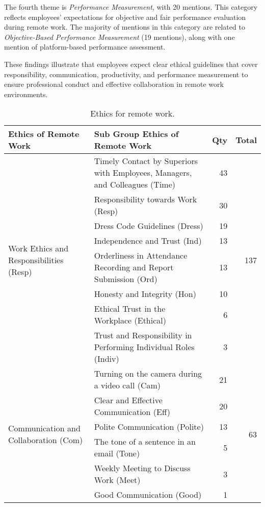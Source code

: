 \documentclass[a4paper, conference]{IEEEtran}
\begin{document}
The fourth theme is \textit{Performance Measurement}, with 20 mentions. This category reflects employees’ expectations for objective and fair performance evaluation during remote work. The majority of mentions in this category are related to \textit{Objective-Based Performance Measurement} (19 mentions), along with one mention of platform-based performance assessment.

These findings illustrate that employees expect clear ethical guidelines that cover responsibility, communication, productivity, and performance measurement to ensure professional conduct and effective collaboration in remote work environments.

\begin{table}
	\centering
	\caption{Ethics for remote work.}
	\label{tab:ethics_for_remote_work}
	\begin{tabular}{|p{}|p{}|r|r|}
		\hline
		\textbf{Ethics of Remote Work} & \textbf{Sub Group Ethics of Remote Work} & \textbf{Qty} & \textbf{Total} \\ \hline
		\multirow{8}{=}{Work Ethics and Responsibilities (Resp)}   
		& Timely Contact by Superiors with Employees, Managers, and Colleagues (Time)  & 43 & \multirow{8}{*}{137} \\ \cline{2-3}
		& Responsibility towards Work (Resp) & 30 & \\ \cline{2-3}
		& Dress Code Guidelines (Dress) & 19 & \\ \cline{2-3}
		& Independence and Trust (Ind) & 13 & \\ \cline{2-3}
		& Orderliness in Attendance Recording and Report Submission (Ord) & 13 & \\ \cline{2-3}
		& Honesty and Integrity (Hon) & 10 & \\ \cline{2-3}
		& Ethical Trust in the Workplace (Ethical) & 6 & \\ \cline{2-3}
		& Trust and Responsibility in Performing Individual Roles (Indiv) & 3 & \\ \hline
		
		\multirow{6}{=}{Communication and Collaboration (Com)}    
		& Turning on the camera during a video call (Cam) & 21 & \multirow{6}{*}{63} \\ \cline{2-3}
		& Clear and Effective Communication (Eff) & 20 & \\ \cline{2-3}
		& Polite Communication (Polite) & 13 & \\ \cline{2-3}
		& The tone of a sentence in an email (Tone) & 5 & \\ \cline{2-3}
		& Weekly Meeting to Discuss Work (Meet) & 3 & \\ \cline{2-3}
		& Good Communication (Good) & 1 & \\ \hline
		

\end{tabular}
\end{table}
\end{document}
